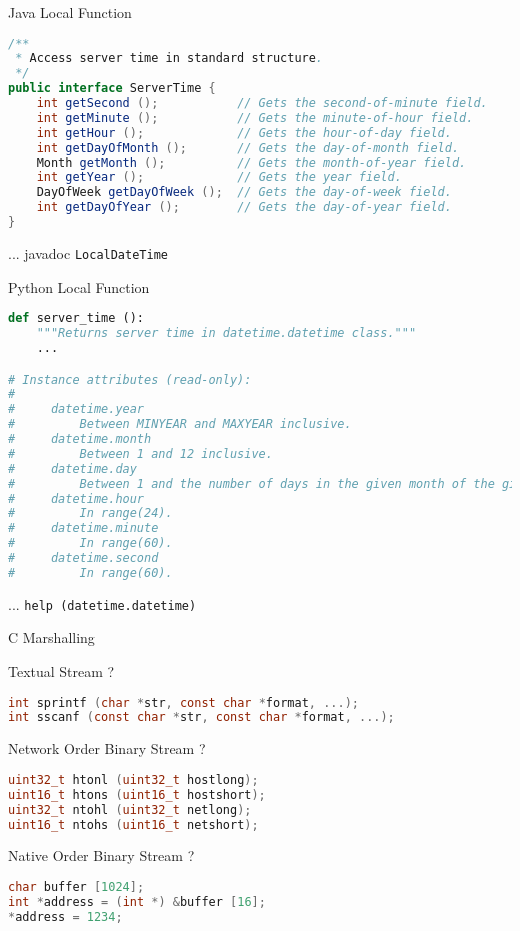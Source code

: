 \begin{frame}[fragile]{Java Local Function}
\begin{lstlisting}[language=java,style=mini]
/**
 * Access server time in standard structure.
 */
public interface ServerTime {
    int getSecond ();           // Gets the second-of-minute field.
    int getMinute ();           // Gets the minute-of-hour field.
    int getHour ();             // Gets the hour-of-day field.
    int getDayOfMonth ();       // Gets the day-of-month field.
    Month getMonth ();          // Gets the month-of-year field.
    int getYear ();             // Gets the year field.
    DayOfWeek getDayOfWeek ();  // Gets the day-of-week field.
    int getDayOfYear ();        // Gets the day-of-year field.
}
\end{lstlisting}
    \hfill ... javadoc \lstinline{LocalDateTime}
\end{frame}


\begin{frame}[fragile]{Python Local Function}
\begin{lstlisting}[language=python,style=mini]
def server_time ():
    """Returns server time in datetime.datetime class."""
    ...

# Instance attributes (read-only):
#
#     datetime.year
#         Between MINYEAR and MAXYEAR inclusive.
#     datetime.month
#         Between 1 and 12 inclusive.
#     datetime.day
#         Between 1 and the number of days in the given month of the given year.
#     datetime.hour
#         In range(24).
#     datetime.minute
#         In range(60).
#     datetime.second
#         In range(60).
\end{lstlisting}
    \hfill ... \lstinline{help (datetime.datetime)}
\end{frame}


\begin{frame}[fragile]{C Marshalling}
    \begin{block}{Textual Stream ?}
\begin{lstlisting}[language=c,style=mini]
int sprintf (char *str, const char *format, ...);
int sscanf (const char *str, const char *format, ...);
\end{lstlisting}
    \end{block}
    \begin{block}{Network Order Binary Stream ?}
\begin{lstlisting}[language=c,style=mini]
uint32_t htonl (uint32_t hostlong);
uint16_t htons (uint16_t hostshort);
uint32_t ntohl (uint32_t netlong);
uint16_t ntohs (uint16_t netshort);
\end{lstlisting}
    \end{block}
    \begin{block}{Native Order Binary Stream ?}
\begin{lstlisting}[language=c,style=mini]
char buffer [1024];
int *address = (int *) &buffer [16];
*address = 1234;
\end{lstlisting}
    \end{block}
\end{frame}


